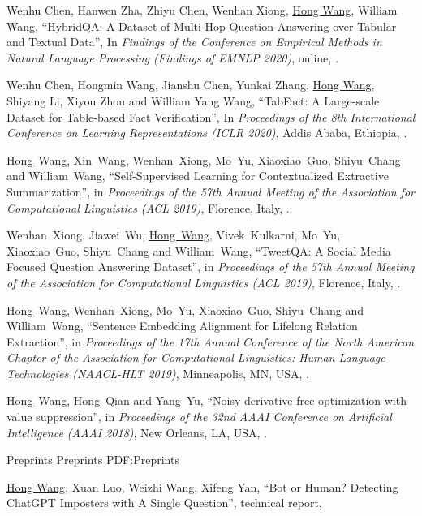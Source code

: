 \documentclass[letterpaper,MMMyyyy,nonstopmode]{simpleresumecv}
\begin{document}
\begin{Body}
\begin{enumerate}[label={[\arabic*]~~}]
\item
Wenhu Chen, Hanwen Zha, Zhiyu Chen, Wenhan Xiong, \underline{Hong Wang}, William Wang,
``HybridQA: A Dataset of Multi-Hop Question Answering over Tabular and Textual Data'',
In \textit{Findings of the Conference on Empirical Methods in Natural Language Processing (Findings of EMNLP 2020)}, online, 
.

\item
Wenhu Chen, Hongmin Wang, Jianshu Chen, Yunkai Zhang, \underline{Hong Wang}, Shiyang Li, Xiyou Zhou and William Yang Wang,
``TabFact: A Large-scale Dataset for Table-based Fact Verification'',
In \textit{Proceedings of the 8th International Conference on Learning Representations (ICLR 2020)}, Addis Ababa, Ethiopia,
.

\item
\underline{Hong~Wang}, Xin~Wang, Wenhan~Xiong, Mo~Yu, Xiaoxiao~Guo, Shiyu~Chang and William~Wang,
``Self-Supervised Learning for Contextualized Extractive Summarization'',
in \textit{Proceedings of the 57th Annual Meeting of the Association for Computational Linguistics (ACL 2019)},
Florence, Italy,
.

\item
Wenhan~Xiong, Jiawei~Wu, \underline{Hong~Wang}, Vivek~Kulkarni, Mo~Yu, Xiaoxiao~Guo, Shiyu~Chang and William~Wang,
``TweetQA: A Social Media Focused Question Answering Dataset'',
in \textit{Proceedings of the 57th Annual Meeting of the Association for Computational Linguistics (ACL 2019)},
Florence, Italy,
.

\item
\underline{Hong~Wang}, Wenhan~Xiong, Mo~Yu, Xiaoxiao~Guo, Shiyu~Chang and William~Wang,
``Sentence Embedding Alignment for Lifelong Relation Extraction'',
in \textit{Proceedings of the 17th Annual Conference of the North American Chapter of the Association for Computational Linguistics: Human Language Technologies (NAACL-HLT 2019)},
Minneapolis, MN, USA,
.

\item
\underline{Hong~Wang}, Hong~Qian and Yang~Yu,
``Noisy derivative-free optimization with value suppression'',
in \textit{Proceedings of the 32nd AAAI Conference on Artificial Intelligence (AAAI 2018)},
New Orleans, LA, USA,
.
\end{enumerate}

\BigGap
\SubSection
{Preprints}
{Preprints}
{PDF:Preprints}
\begin{enumerate}[label={[\arabic*]~~}]
\item 
\underline{Hong Wang}, Xuan Luo, Weizhi Wang, Xifeng Yan,
``Bot or Human? Detecting ChatGPT Imposters with A Single Question'',
technical report,


\end{enumerate}
\end{Body}
\end{document}
